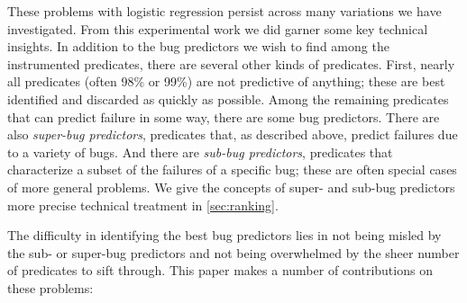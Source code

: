 \documentclass[draft]{sig-alternate}
\begin{document}
These problems with logistic regression persist across many variations
we have investigated. From this experimental work we did garner some
key technical insights.  In addition to the bug predictors we wish to
find among the instrumented predicates, there are several other kinds
of predicates.  First, nearly all predicates (often 98\% or 99\%) are
not predictive of anything; these are best identified and discarded as
quickly as possible. Among the remaining predicates that can
predict failure in some way, there are some bug predictors.
There are also {\em super-bug predictors}, predicates that, as
described above, predict failures due to a variety of bugs.  And there
are {\em sub-bug predictors}, predicates that characterize a subset of
the failures of a specific bug; these are often special cases of more
general problems.  We give the concepts of super- and sub-bug
predictors more precise technical treatment in
\autoref{sec:ranking}.

The difficulty in identifying the best bug predictors lies in not being
misled by the sub- or super-bug predictors and not being overwhelmed
by the sheer number of predicates to sift through.
This paper makes a number of contributions on these problems:
\end{document}
